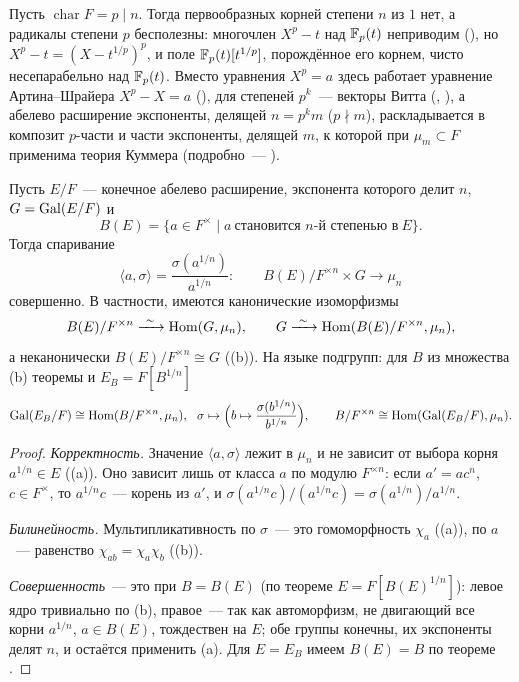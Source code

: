 \begin{remark}
Пусть $\operatorname{char}F=p\mid n$. Тогда первообразных корней степени $n$ из $1$ нет, а радикалы степени $p$
бесполезны: многочлен $X^p-t$ над $\mathbb F_p(t)$ неприводим (), но $X^p-t=(X-t^{1/p})^p$, и поле $\mathbb F_p(t)[t^{1/p}]$,
порождённое его корнем, чисто несепарабельно над $\mathbb F_p(t)$. Вместо уравнения $X^p=a$ здесь работает уравнение
Артина--Шрайера $X^p-X=a$ (), для степеней $p^k$~--- векторы Витта (, ), а абелево расширение
экспоненты, делящей $n=p^km$ ($p\nmid m$), раскладывается в композит $p$-части и части экспоненты, делящей $m$, к
которой при $\mu_m\subset F$ применима теория Куммера (подробно~--- ).
\end{remark}

\begin{remark}
Пусть $E/F$~--- конечное абелево расширение, экспонента которого делит $n$, $G=\operatorname{Gal}(E/F)$ и
\[
B(E)=\{a\in F^\times\mid a\ \text{становится $n$-й степенью в}\ E\}.
\]
Тогда спаривание
\[
\langle a,\sigma\rangle=\frac{\sigma(a^{1/n})}{a^{1/n}}\colon\qquad B(E)/F^{\times n}\times G\to\mu_n
\]
совершенно. В частности, имеются канонические изоморфизмы
\[
B(E)/F^{\times n}\xrightarrow{\ \sim\ }\Hom(G,\mu_n),\qquad G\xrightarrow{\ \sim\ }\Hom(B(E)/F^{\times n},\mu_n),
\]
а неканонически $B(E)/F^{\times n}\cong G$ ((b)). На языке подгрупп: для $B$ из множества (b) теоремы  и
$E_B=F[B^{1/n}]$
\[
\Gal(E_B/F)\cong\Hom(B/F^{\times n},\mu_n),\ \ \sigma\mapsto\Bigl(b\mapsto\frac{\sigma(b^{1/n})}{b^{1/n}}\Bigr),\qquad
B/F^{\times n}\cong\Hom(\Gal(E_B/F),\mu_n).
\]
\end{remark}

\begin{proof}
\emph{Корректность.} Значение $\langle a,\sigma\rangle$ лежит в $\mu_n$ и не зависит от выбора корня $a^{1/n}\in E$
((a)). Оно зависит лишь от класса $a$ по модулю $F^{\times n}$: если $a'=ac^n$, $c\in F^\times$, то $a^{1/n}c$~---
корень из $a'$, и $\sigma(a^{1/n}c)/(a^{1/n}c)=\sigma(a^{1/n})/a^{1/n}$.

\emph{Билинейность.} Мультипликативность по $\sigma$~--- это гомоморфность $\chi_a$ ((a)), по $a$~--- равенство
$\chi_{ab}=\chi_a\chi_b$ ((b)).

\emph{Совершенность}~--- это  при $B=B(E)$ (по теореме  $E=F[B(E)^{1/n}]$): левое ядро тривиально по
(b), правое~--- так как автоморфизм, не двигающий все корни $a^{1/n}$, $a\in B(E)$, тождествен на $E$; обе группы
конечны, их экспоненты делят $n$, и остаётся применить (a). Для $E=E_B$ имеем $B(E)=B$ по теореме .
\end{proof}

